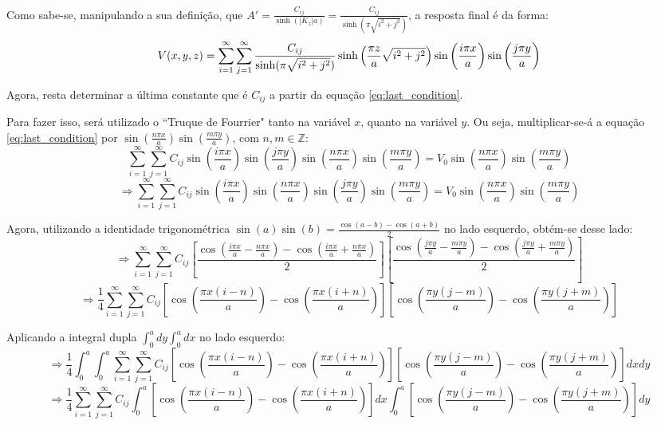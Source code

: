 \documentclass{report}
\begin{document}
Como sabe-se, manipulando a sua definição, que $ A' = \frac{C_{ij}}{\sinh(|K_z|a)} = \frac{C_{ij}}{\sinh(\pi\sqrt{i^2 + j^2})} $, a resposta final é da forma:
\begin{equation}
  \label{eq:problem_part2_solution}
  \centering
  V(x, y, z) = \sum_{i=1}^{\infty} \sum_{j=1}^{\infty} \frac{C_{ij}}{\sinh(\pi\sqrt{i^2 + j^2})}\sinh\left(\frac{\pi z}{a}\sqrt{i^2 + j^2}\right)\sin\left(\frac{i\pi x}{a}\right)\sin\left(\frac{j\pi y}{a}\right)
\end{equation}

Agora, resta determinar a última constante que é $ C_{ij} $ a partir da equação \ref{eq:last_condition}.

Para fazer isso, será utilizado o ``Truque de Fourrier" tanto na variável $ x $, quanto na variável $ y $. Ou seja, multiplicar-se-á a equação
\ref{eq:last_condition} por $ \sin\left(\frac{n\pi x}{a}\right)\sin\left(\frac{m\pi y}{a}\right) $, com $ n, m \in \mathbb{Z} $:
$$ \sum_{i=1}^{\infty} \sum_{j=1}^{\infty} C_{ij}\sin\left(\frac{i\pi x}{a}\right)\sin\left(\frac{j\pi y}{a}\right)\sin\left(\frac{n\pi x}{a}\right)\sin\left(\frac{m\pi y}{a}\right) = V_0\sin\left(\frac{n\pi x}{a}\right)\sin\left(\frac{m\pi y}{a}\right) $$
$$ \Rightarrow \sum_{i=1}^{\infty} \sum_{j=1}^{\infty} C_{ij}\sin\left(\frac{i\pi x}{a}\right)\sin\left(\frac{n\pi x}{a}\right)\sin\left(\frac{j\pi y}{a}\right)\sin\left(\frac{m\pi y}{a}\right) = V_0\sin\left(\frac{n\pi x}{a}\right)\sin\left(\frac{m\pi y}{a}\right) $$

Agora, utilizando a identidade trigonométrica $ \sin(a)\sin(b) = \frac{\cos(a - b) - \cos(a + b)}{2} $ no lado esquerdo, obtém-se desse lado:
$$ \Rightarrow \sum_{i=1}^{\infty} \sum_{j=1}^{\infty} C_{ij}\left[\frac{\cos\left(\frac{i\pi x}{a} - \frac{n\pi x}{a}\right) - \cos\left(\frac{i\pi x}{a} + \frac{n\pi x}{a}\right)}{2}\right]\left[\frac{\cos\left(\frac{j\pi y}{a} - \frac{m\pi y}{a}\right) - \cos\left(\frac{j\pi y}{a} + \frac{m\pi y}{a}\right)}{2}\right]$$
$$ \Rightarrow \frac{1}{4}\sum_{i=1}^{\infty} \sum_{j=1}^{\infty} C_{ij}\left[\cos\left(\frac{\pi x(i - n)}{a}\right) - \cos\left(\frac{\pi x(i + n)}{a}\right)\right]\left[\cos\left(\frac{\pi y(j - m)}{a}\right) - \cos\left(\frac{\pi y(j + m)}{a}\right)\right]$$

Aplicando a integral dupla $ \int_{0}^{a}dy\int_{0}^{a}dx $ no lado esquerdo:
$$ \textstyle \Rightarrow \frac{1}{4}\int_{0}^{a}\int_{0}^{a}\sum_{i=1}^{\infty} \sum_{j=1}^{\infty} C_{ij}\left[\cos\left(\frac{\pi x(i - n)}{a}\right) - \cos\left(\frac{\pi x(i + n)}{a}\right)\right]\left[\cos\left(\frac{\pi y(j - m)}{a}\right) - \cos\left(\frac{\pi y(j + m)}{a}\right)\right]dxdy $$
$$ \textstyle \Rightarrow \frac{1}{4} \sum_{i=1}^{\infty} \sum_{j=1}^{\infty} C_{ij} \int_{0}^{a} \left[\cos\left(\frac{\pi x(i - n)}{a}\right) - \cos\left(\frac{\pi x(i + n)}{a}\right)\right]dx\int_{0}^{a}\left[\cos\left(\frac{\pi y(j - m)}{a}\right) - \cos\left(\frac{\pi y(j + m)}{a}\right)\right]dy $$
\end{document}
